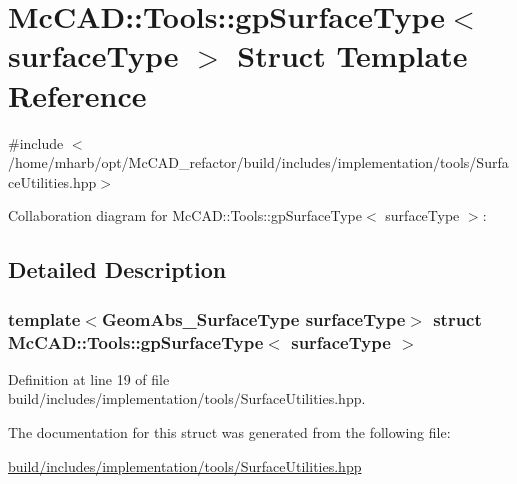 \hypertarget{structMcCAD_1_1Tools_1_1gpSurfaceType}{}\section{Mc\+C\+AD\+:\+:Tools\+:\+:gp\+Surface\+Type$<$ surface\+Type $>$ Struct Template Reference}
\label{structMcCAD_1_1Tools_1_1gpSurfaceType}


{\ttfamily \#include $<$/home/mharb/opt/\+Mc\+C\+A\+D\+\_\+refactor/build/includes/implementation/tools/\+Surface\+Utilities.\+hpp$>$}



Collaboration diagram for Mc\+C\+AD\+:\+:Tools\+:\+:gp\+Surface\+Type$<$ surface\+Type $>$\+:


\subsection{Detailed Description}
\subsubsection*{template$<$Geom\+Abs\+\_\+\+Surface\+Type surface\+Type$>$\newline
struct Mc\+C\+A\+D\+::\+Tools\+::gp\+Surface\+Type$<$ surface\+Type $>$}



Definition at line 19 of file build/includes/implementation/tools/\+Surface\+Utilities.\+hpp.



The documentation for this struct was generated from the following file\+:\begin{DoxyCompactItemize}
\item 
\hyperlink{build_2includes_2implementation_2tools_2SurfaceUtilities_8hpp}{build/includes/implementation/tools/\+Surface\+Utilities.\+hpp}\end{DoxyCompactItemize}
